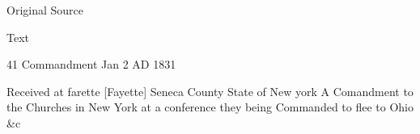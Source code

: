 			
			\begin{description}
				\item[Original Source]
			\end{description}
			
			
			\begin{description}
				\item[Text]
			\end{description}
			
				\begin{tightcenter}
				41 Commandment Jan 2 AD 1831
				\end{tightcenter}
				
				Received at farette [Fayette] Seneca County State of New york A Comandment to the Churches in New York at a conference they being Commanded to flee to Ohio \&c
				
